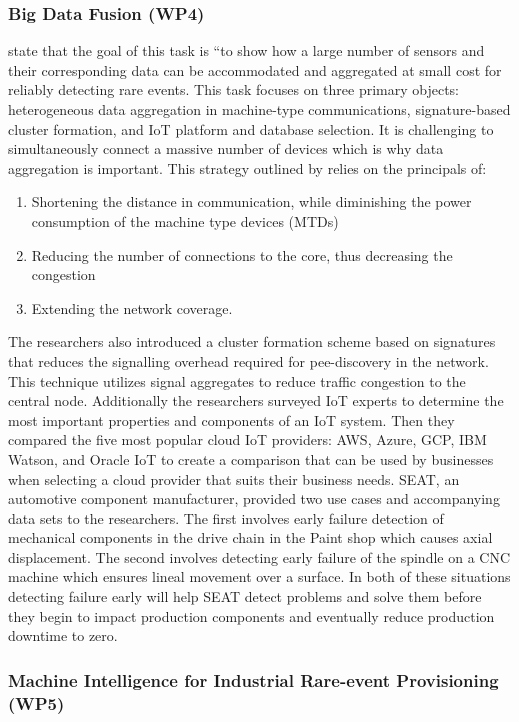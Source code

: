 \subsubsection{Big Data Fusion (WP4)}
\label{ref_wp4}
\cite{wp4.1} state that the goal of this task is ``to show how a large number of sensors and their corresponding data can be  accommodated and aggregated at small cost for reliably detecting rare events. This task focuses on three primary objects: heterogeneous data aggregation in machine-type communications, signature-based cluster formation, and IoT platform and database selection. It is challenging to simultaneously connect a massive number of devices which is why data aggregation is important. This strategy outlined by \cite{massive-machine} relies on the principals of:
\begin{enumerate}
  \item Shortening the distance in communication, while diminishing the power consumption of the machine type devices (MTDs)
  \item Reducing the number of connections to the core, thus decreasing the congestion
  \item Extending the network coverage. 
\end{enumerate}
The researchers also introduced a cluster formation scheme based on signatures that reduces the signalling overhead required for pee-discovery in the network. This technique utilizes signal aggregates to reduce traffic congestion to the central node. Additionally the researchers surveyed IoT experts to determine the most important properties and components of an IoT system. Then they compared the five most popular cloud IoT providers: AWS, Azure, GCP, IBM Watson, and Oracle IoT to create a comparison that can be used by businesses when selecting a cloud provider that suits their business needs. SEAT, an automotive component manufacturer, provided two use cases and accompanying data sets to the researchers. The first involves early failure detection of mechanical components in the drive chain in the Paint shop which causes axial displacement. The second involves detecting early failure of the spindle on a CNC machine which ensures lineal movement over a surface. In both of these situations detecting failure early will help SEAT detect problems and solve them before they begin to impact production components and eventually reduce production downtime to zero. 

\subsubsection{Machine Intelligence for Industrial Rare-event Provisioning (WP5)}

